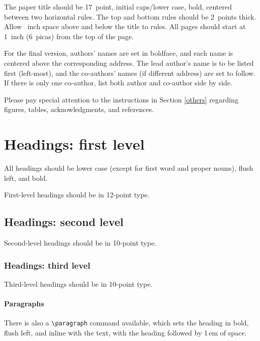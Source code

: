 \documentclass{article}
\begin{document}
The paper title should be 17~point, initial caps/lower case, bold, centered
between two horizontal rules. The top and bottom rules should be 2~points thick.
Allow ~inch space above and below the title to rules. All pages
should start at 1~inch (6~picas) from the top of the page.


For the final version, authors' names are set in boldface, and each name is
centered above the corresponding address. The lead author's name is to be listed
first (left-most), and the co-authors' names (if different address) are set to
follow. If there is only one co-author, list both author and co-author side by
side.


Please pay special attention to the instructions in Section \ref{others}
regarding figures, tables, acknowledgments, and references.

\section{Headings: first level}
\label{headings}


All headings should be lower case (except for first word and proper nouns),
flush left, and bold.


First-level headings should be in 12-point type.


\subsection{Headings: second level}


Second-level headings should be in 10-point type.


\subsubsection{Headings: third level}


Third-level headings should be in 10-point type.


\paragraph{Paragraphs}


There is also a \verb+\paragraph+ command available, which sets the heading in
bold, flush left, and inline with the text, with the heading followed by 1\,em
of space.
\end{document}
